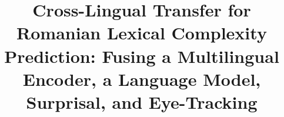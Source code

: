 \usepackage[utf8]{inputenc}

\usepackage{microtype}

\usepackage{inconsolata}

\usepackage{graphicx}

\usepackage{booktabs}          %
\graphicspath{{figures/}}      %

\renewcommand{\topfraction}{0.9}
\renewcommand{\bottomfraction}{0.5}
\renewcommand{\textfraction}{0.08}
\renewcommand{\floatpagefraction}{0.8}

%
%

\title{Cross-Lingual Transfer for Romanian Lexical Complexity Prediction:
       Fusing a Multilingual Encoder, a Language Model, Surprisal, and
       Eye-Tracking}


